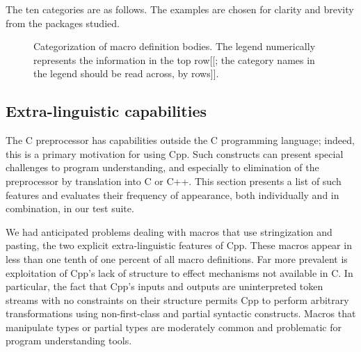 \documentclass[10pt]{article}
\begin{document}
The ten categories are as follows.  The examples are chosen for clarity
and brevity from the packages studied.


\begin{figure}
\centerline{}
\caption{Categorization of macro definition bodies.  The legend numerically
  represents the information in the top row[[; the category names in the
  legend should be read across, by rows]].}
\label{fig:categorization}
\end{figure}


{}







\subsection{Extra-linguistic capabilities}
\label{sec:extra-linguistic}

The C preprocessor has capabilities outside the C programming language;
indeed, this is a primary motivation for using Cpp.  Such constructs can
present special challenges to program understanding, and especially to
elimination of the preprocessor by translation into C or C++.  This section
presents a list of such features and evaluates their frequency of
appearance, both individually and in combination, in our test suite.

We had anticipated problems dealing with macros that use stringization and
pasting, the two explicit extra-linguistic features of Cpp.  These macros
appear in less than one tenth of one percent of all macro definitions.  Far
more prevalent is exploitation of Cpp's lack of structure to effect
mechanisms not available in C\@.  In particular, the fact that Cpp's inputs
and outputs are uninterpreted token streams with no constraints on their
structure permits Cpp to perform arbitrary transformations using
non-first-class and partial syntactic constructs.  Macros that manipulate
types or partial types are moderately common and problematic for program
understanding tools.
\end{document}
